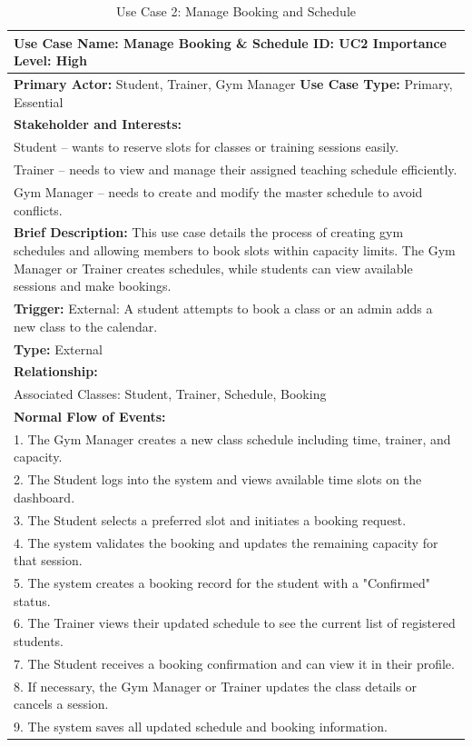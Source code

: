 \documentclass[12pt, a4paper]{article}
\begin{document}
\begin{table}[H]
    \centering
    \caption{Use Case 2: Manage Booking and Schedule}
    \renewcommand{\arraystretch}{1.3} %
    \small
    \begin{tabularx}{\textwidth}{X}
        \hline
        \textbf{Use Case Name:} Manage Booking \& Schedule \hfill \textbf{ID:} UC2 \hfill \textbf{Importance Level:} High \\
        \hline
        \textbf{Primary Actor:} Student, Trainer, Gym Manager \hfill \textbf{Use Case Type:} Primary, Essential \\
        \textbf{Stakeholder and Interests:} \\
        Student -- wants to reserve slots for classes or training sessions easily. \\
        Trainer -- needs to view and manage their assigned teaching schedule efficiently. \\
        Gym Manager -- needs to create and modify the master schedule to avoid conflicts. \\
        \textbf{Brief Description:} This use case details the process of creating gym schedules and allowing members to book slots within capacity limits. The Gym Manager or Trainer creates schedules, while students can view available sessions and make bookings. \\
        \textbf{Trigger:} External: A student attempts to book a class or an admin adds a new class to the calendar. \\
        \textbf{Type:} External \\
        \textbf{Relationship:} \\
        Associated Classes: Student, Trainer, Schedule, Booking  \\
        \textbf{Normal Flow of Events:} \\
             1. The Gym Manager creates a new class schedule including time, trainer, and capacity.\\
             2. The Student logs into the system and views available time slots on the dashboard.\\
            3. The Student selects a preferred slot and initiates a booking request.\\
            4. The system validates the booking and updates the remaining capacity for that session.\\
            5. The system creates a booking record for the student with a "Confirmed" status.\\
            6. The Trainer views their updated schedule to see the current list of registered students.\\
            7. The Student receives a booking confirmation and can view it in their profile.\\
            8. If necessary, the Gym Manager or Trainer updates the class details or cancels a session.\\
            9. The system saves all updated schedule and booking information.\\
         

\end{tabularx}
\end{table}
\end{document}
